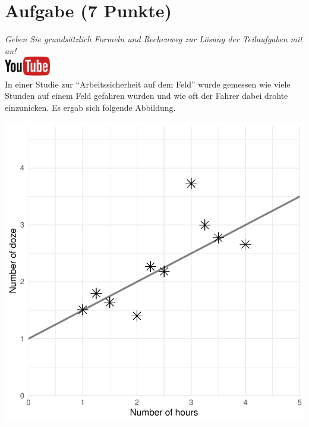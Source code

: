 \documentclass[a4paper, 10pt]{scrartcl}\usepackage[]{graphicx}\usepackage[]{xcolor}
\makeatletter
\def\maxwidth{ %
  \ifdim\Gin@nat@width>\linewidth
    \linewidth
  \else
    \Gin@nat@width
  \fi
}
\makeatother
\begin{document}
\section{Aufgabe \hfill (7 Punkte)}

\textit{Geben Sie grunds{\"a}tzlich Formeln und Rechenweg zur L{\"o}sung der
  Teilaufgaben mit an!} \\[1Ex]

\hfill\href{https://youtu.be/2dUJcYK9RgU}{\includegraphics[width =
  2cm]{img/youtube}}\\[1Ex]

In einer Studie zur "`Arbeitssicherheit auf dem Feld"' wurde gemessen wie viele
Stunden auf einem Feld gefahren wurden und wie oft der Fahrer dabei drohte
einzunicken. Es ergab sich folgende Abbildung. 



{\centering \includegraphics[width=\maxwidth]{img/scatter-02-1} 

}
\end{document}
